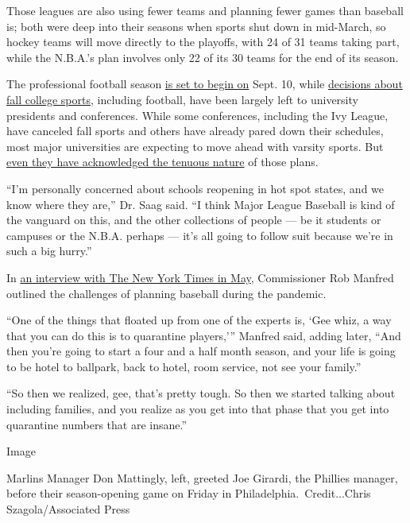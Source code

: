 Those leagues are also using fewer teams and planning fewer games than
baseball is; both were deep into their seasons when sports shut down in
mid-March, so hockey teams will move directly to the playoffs, with 24
of 31 teams taking part, while the N.B.A.'s plan involves only 22 of its
30 teams for the end of its season.

The professional football season
\href{https://www.nytimes3xbfgragh.onion/2020/07/24/sports/football/nfl-players-regular-season-start.html}{is
set to begin on} Sept. 10, while
\href{https://www.nytimes3xbfgragh.onion/2020/07/16/sports/ncaafootball/ncaa-guidelines-fall-sports.html}{decisions
about fall college sports}, including football, have been largely left
to university presidents and conferences. While some conferences,
including the Ivy League, have canceled fall sports and others have
already pared down their schedules, most major universities are
expecting to move ahead with varsity sports. But
\href{https://www.nytimes3xbfgragh.onion/2020/07/10/sports/ncaafootball/coronavirus-college-football-season-canceled.html}{even
they have acknowledged the tenuous nature} of those plans.

``I'm personally concerned about schools reopening in hot spot states,
and we know where they are,'' Dr. Saag said. ``I think Major League
Baseball is kind of the vanguard on this, and the other collections of
people --- be it students or campuses or the N.B.A. perhaps --- it's all
going to follow suit because we're in such a big hurry.''

In
\href{https://www.nytimes3xbfgragh.onion/2020/07/24/podcasts/the-daily/mlb-baseball-season-coronavirus.html}{an
interview with The New York Times in May}, Commissioner Rob Manfred
outlined the challenges of planning baseball during the pandemic.

``One of the things that floated up from one of the experts is, `Gee
whiz, a way that you can do this is to quarantine players,''' Manfred
said, adding later, ``And then you're going to start a four and a half
month season, and your life is going to be hotel to ballpark, back to
hotel, room service, not see your family.''

``So then we realized, gee, that's pretty tough. So then we started
talking about including families, and you realize as you get into that
phase that you get into quarantine numbers that are insane.''

Image

Marlins Manager Don Mattingly, left, greeted Joe Girardi, the Phillies
manager, before their season-opening game on Friday in
Philadelphia.~Credit...Chris Szagola/Associated Press

